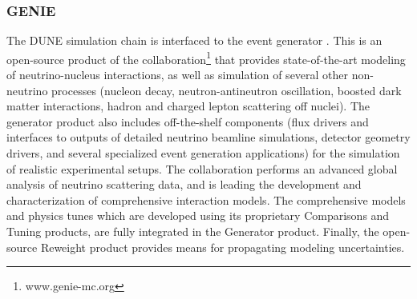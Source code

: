 \subsubsection{GENIE}

The DUNE  simulation chain is interfaced to the  event generator \cite{Andreopoulos:2009rq}. This is an open-source product of the  collaboration\footnote{www.genie-mc.org}  that provides state-of-the-art modeling of neutrino-nucleus interactions, as well as simulation of several other non-neutrino processes (nucleon decay, neutron-antineutron oscillation, boosted dark matter interactions, hadron and charged lepton scattering off nuclei). The generator product also includes off-the-shelf components (flux drivers and interfaces to outputs of detailed neutrino beamline simulations, detector geometry drivers, and several specialized event generation applications) for the simulation of realistic experimental setups. The  collaboration performs an advanced global analysis of neutrino scattering data, and is leading the development and characterization of comprehensive interaction models. The  comprehensive models and physics tunes which are developed using its proprietary Comparisons and Tuning products, are fully integrated in the  Generator product. Finally, the open-source  Reweight product provides means for propagating modeling uncertainties. 

